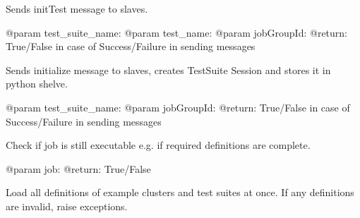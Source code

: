 \documentclass[letterpaper,10pt,english]{sphinxmanual}
\begin{document}
\begin{fulllineitems}
\begin{fulllineitems}
\label{ref-manual/XrdTestMaster:XrdTestMaster.XrdTestMaster.initializeTestCase}
Sends initTest message to slaves.

@param test\_suite\_name:
@param test\_name:
@param jobGroupId:
@return: True/False in case of Success/Failure in sending messages

\end{fulllineitems}


\begin{fulllineitems}
\label{ref-manual/XrdTestMaster:XrdTestMaster.XrdTestMaster.initializeTestSuite}
Sends initialize message to slaves, creates TestSuite Session
and stores it in python shelve.

@param test\_suite\_name:
@param jobGroupId:
@return: True/False in case of Success/Failure in sending messages

\end{fulllineitems}


\begin{fulllineitems}
\label{ref-manual/XrdTestMaster:XrdTestMaster.XrdTestMaster.isJobValid}
Check if job is still executable e.g. if required definitions
are complete.

@param job:
@return: True/False

\end{fulllineitems}


\begin{fulllineitems}
\label{ref-manual/XrdTestMaster:XrdTestMaster.XrdTestMaster.loadDefinitions}
Load all definitions of example clusters and test suites at once.
If any definitions are invalid, raise exceptions.

\end{fulllineitems}



\end{fulllineitems}
\end{document}
